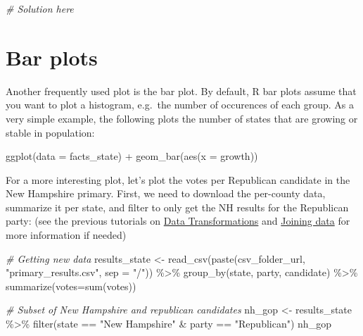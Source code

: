 \documentclass[
]{article}
\newenvironment{Shaded}{\begin{snugshade}}{\end{snugshade}}
\newcommand{\AttributeTok}[1]{\textcolor[rgb]{0.77,0.63,0.00}{#1}}
\newcommand{\CommentTok}[1]{\textcolor[rgb]{0.56,0.35,0.01}{\textit{#1}}}
\newcommand{\FunctionTok}[1]{\textcolor[rgb]{0.00,0.00,0.00}{#1}}
\newcommand{\NormalTok}[1]{#1}
\newcommand{\OtherTok}[1]{\textcolor[rgb]{0.56,0.35,0.01}{#1}}
\newcommand{\SpecialCharTok}[1]{\textcolor[rgb]{0.00,0.00,0.00}{#1}}
\newcommand{\StringTok}[1]{\textcolor[rgb]{0.31,0.60,0.02}{#1}}
\begin{document}
\begin{Shaded}
\begin{Highlighting}[]
\CommentTok{\# Solution here}
\end{Highlighting}
\end{Shaded}

\hypertarget{bar-plots}{%
\section{Bar plots}\label{bar-plots}}

Another frequently used plot is the bar plot. By default, R bar plots
assume that you want to plot a histogram, e.g.~the number of occurences
of each group. As a very simple example, the following plots the number
of states that are growing or stable in population:

\begin{Shaded}
\begin{Highlighting}[]
\FunctionTok{ggplot}\NormalTok{(}\AttributeTok{data =}\NormalTok{ facts\_state) }\SpecialCharTok{+} 
  \FunctionTok{geom\_bar}\NormalTok{(}\FunctionTok{aes}\NormalTok{(}\AttributeTok{x =}\NormalTok{ growth))}
\end{Highlighting}
\end{Shaded}

For a more interesting plot, let's plot the votes per Republican
candidate in the New Hampshire primary. First, we need to download the
per-county data, summarize it per state, and filter to only get the NH
results for the Republican party: (see the previous tutorials on
\href{R-tidy-5-transformation.md}{Data Transformations} and
\href{R-tidy-13a-joining.md}{Joining data} for more information if
needed)

\begin{Shaded}
\begin{Highlighting}[]
\CommentTok{\# Getting new data}
\NormalTok{results\_state }\OtherTok{\textless{}{-}} \FunctionTok{read\_csv}\NormalTok{(}\FunctionTok{paste}\NormalTok{(csv\_folder\_url, }\StringTok{"primary\_results.csv"}\NormalTok{, }\AttributeTok{sep =} \StringTok{"/"}\NormalTok{)) }\SpecialCharTok{\%\textgreater{}\%} 
  \FunctionTok{group\_by}\NormalTok{(state, party, candidate) }\SpecialCharTok{\%\textgreater{}\%} 
  \FunctionTok{summarize}\NormalTok{(}\AttributeTok{votes=}\FunctionTok{sum}\NormalTok{(votes))}

\CommentTok{\# Subset of New Hampshire and republican candidates}
\NormalTok{nh\_gop }\OtherTok{\textless{}{-}}\NormalTok{ results\_state }\SpecialCharTok{\%\textgreater{}\%} 
  \FunctionTok{filter}\NormalTok{(state }\SpecialCharTok{==} \StringTok{"New Hampshire"} \SpecialCharTok{\&}\NormalTok{ party }\SpecialCharTok{==} \StringTok{"Republican"}\NormalTok{)}
\NormalTok{nh\_gop}
\end{Highlighting}
\end{Shaded}
\end{document}
